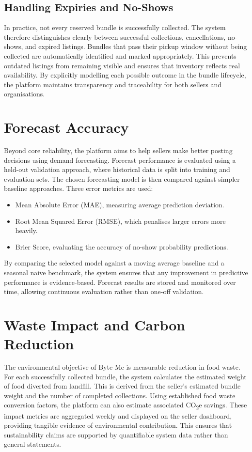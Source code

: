 \documentclass[11pt, a4paper]{report}
\begin{document}
\subsection{Handling Expiries and No-Shows}
In practice, not every reserved bundle is successfully collected. The system therefore distinguishes clearly between successful collections, cancellations, no-shows, and expired listings.
Bundles that pass their pickup window without being collected are automatically identified and marked appropriately. This prevents outdated listings from remaining visible and ensures that inventory reflects real availability.
By explicitly modelling each possible outcome in the bundle lifecycle, the platform maintains transparency and traceability for both sellers and organisations.

\section{Forecast Accuracy}
Beyond core reliability, the platform aims to help sellers make better posting decisions using demand forecasting.
Forecast performance is evaluated using a held-out validation approach, where historical data is split into training and evaluation sets. The chosen forecasting model is then compared against simpler baseline approaches.
Three error metrics are used:

\begin{itemize}
\item Mean Absolute Error (MAE), measuring average prediction deviation.
\item Root Mean Squared Error (RMSE), which penalises larger errors more heavily.
\item Brier Score, evaluating the accuracy of no-show probability predictions.
\end{itemize}
By comparing the selected model against a moving average baseline and a seasonal naive benchmark, the system ensures that any improvement in predictive performance is evidence-based. Forecast results are stored and monitored over time, allowing continuous evaluation rather than one-off validation.

\section{Waste Impact and Carbon Reduction}

The environmental objective of Byte Me is measurable reduction in food waste.
For each successfully collected bundle, the system calculates the estimated weight of food diverted from landfill. This is derived from the seller’s estimated bundle weight and the number of completed collections.
Using established food waste conversion factors, the platform can also estimate associated CO\textsubscript{2}e savings. These impact metrics are aggregated weekly and displayed on the seller dashboard, providing tangible evidence of environmental contribution.
This ensures that sustainability claims are supported by quantifiable system data rather than general statements.
\end{document}
